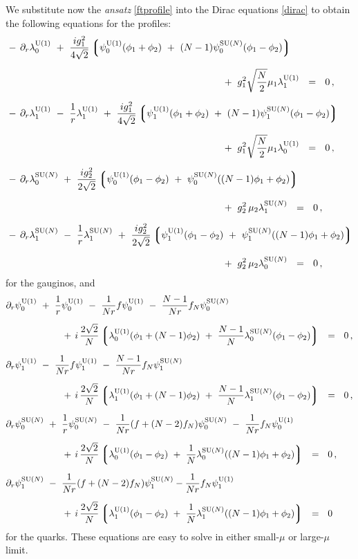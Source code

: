 \documentclass[12pt]{article}
\newcommand{\p}{\partial}
\newcommand{\lgr}{\left\lgroup}
\newcommand{\rgr}{\right\rgroup}
\newcommand{\loU}{\lambda_0^{\rm U(1)}}
\newcommand{\llU}{\lambda_1^{\rm U(1)}}
\newcommand{\loN}{\lambda_0^\text{SU($N$)}}
\newcommand{\llN}{\lambda_1^\text{SU($N$)}}
\newcommand{\poU}{\psi_0^{\rm U(1)}}
\newcommand{\plU}{\psi_1^{\rm U(1)}}
\newcommand{\poN}{\psi_0^\text{SU($N$)}}
\newcommand{\plN}{\psi_1^\text{SU($N$)}}
\begin{document}
	We substitute now the {\it ansatz} \eqref{ftprofile} into the Dirac equations \eqref{dirac} to obtain the following
	equations for the profiles:
\begin{align}
%
\notag
&
	-\, \p_r \loU ~+~ \frac{i g_1^2}{4\sqrt{2}} 
			\lgr \poU (\phi_1 + \phi_2) ~+~ (N-1) \poN (\phi_1 - \phi_2) \rgr  \\[2mm]
\notag
	&\qquad\qquad\qquad\qquad\qquad\qquad\qquad\qquad\qquad\qquad\qquad
				~+~ g_1^2 \sqrt{\frac{N}{2}} \mu_1 \llU    ~~=~~ 0\,,
	\\[2mm]
%
\notag
&
	-\, \p_r \llU ~-~ \frac{1}{r}\llU 
	~+~ \frac{i g_1^2}{4\sqrt{2}} 
	    \lgr \plU (\phi_1 + \phi_2) ~+~ (N-1) \plN (\phi_1 - \phi_2) \rgr \\[2mm]
\notag
	&\qquad\qquad\qquad\qquad\qquad\qquad\qquad\qquad\qquad\qquad\qquad
	~+~ g_1^2 \sqrt{\frac{N}{2}} \mu_1 \loU ~~=~~ 0\,,
	\\[2mm]
%
\label{lambdaeqs}
&
	-\, \p_r \loN ~+~ 
	\frac{i g_2^2}{2\sqrt{2}}
		\lgr \poU (\phi_1 - \phi_2) ~+~ \poN ( (N-1) \phi_1 + \phi_2 ) \rgr \\[2mm]
\notag
	&\qquad\qquad\qquad\qquad\qquad\qquad\qquad\qquad\qquad\qquad\qquad
	~+~ g_2^2\, \mu_2 \llN ~~=~~ 0\,,
	\\[2mm]
%
\notag
&
	-\, \p_r \llN ~-~ \frac{1}{r}\llN
	~+~ \frac{i g_2^2}{2\sqrt{2}} 
		\lgr \plU (\phi_1 - \phi_2) ~+~ \plN ( (N-1) \phi_1 + \phi_2 ) \rgr \\[2mm]
\notag
	&\qquad\qquad\qquad\qquad\qquad\qquad\qquad\qquad\qquad\qquad\qquad
	~+~ g_2^2\, \mu_2 \loN ~~=~~ 0\,,
\end{align}
	for the gauginos, and 
\begin{align}
%
\notag
&
	\p_r \poU ~+~ \frac{1}{r} \poU ~-~ \frac{1}{Nr}f \poU ~-~ \frac{N-1}{Nr} f_N \poN 
	 \\[2mm]
&\notag
\qquad\qquad\qquad
	+\,i\, \frac{2\sqrt{2}}{N} 
		\lgr  \loU (\phi_1 + (N-1)\phi_2) ~+~ \frac{N-1}{N} \loN (\phi_1 - \phi_2) \rgr 
		~~=~~ 0\,,
	\\[2mm]
%
&
\notag
	\p_r \plU ~-~ \frac{1}{Nr}f \plU ~-~ \frac{N-1}{Nr} f_N \plN 
	 \\[2mm]
&\notag
\qquad\qquad\qquad
	+\,i\, \frac{2\sqrt{2}}{N}
		\lgr \llU (\phi_1 + (N-1) \phi_2) ~+~ \frac{N-1}{N} \llN (\phi_1 - \phi_2) \rgr
		~~=~~ 0\,,
	\\[2mm]
%
&
\label{psieqs}
	\p_r \poN ~+~ \frac{1}{r} \poN ~-~ \frac{1}{Nr} (f + (N-2)f_N) \poN ~-~
			\frac{1}{Nr} f_N \poU 
	 \\[2mm]
&\notag
\qquad\qquad\qquad
	+\, i\, \frac{2\sqrt{2}}{N} 
		\lgr \loU (\phi_1 - \phi_2) ~+~ \frac{1}{N} \loN ((N-1)\phi_1 + \phi_2) \rgr
		~~=~~ 0\,,
	\\[2mm]
%
&
\notag
	\p_r \plN ~-~ \frac{1}{Nr} (f + (N-2)f_N) \plN - \frac{1}{Nr} f_N \plU 
	   \\[2mm]
&\notag
\qquad\qquad\qquad
	+\,i\, \frac{2\sqrt{2}}{N}
		\lgr \llU (\phi_1 - \phi_2) ~+~ \frac{1}{N} \llN ((N-1)\phi_1 + \phi_2) \rgr
		~~=~~ 0~
\end{align}
	for the quarks.
	These equations are easy to solve in either small-$ \mu $ or large-$ \mu $ limit.
\end{document}
